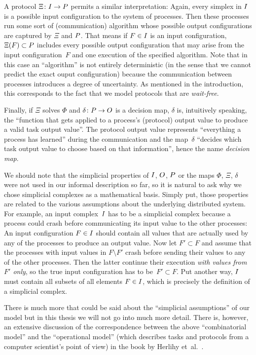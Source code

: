 A protocol $\Xi\colon I\to P$ permits a similar interpretation:
Again, every simplex in $I$ is a possible input configuration to
the system of processes. Then these processes run some sort of
(communication) algorithm whose possible output configurations are
captured by $\Xi$ and $P$. That means if $F\in I$ is an input
configuration, $\Xi(F) \subset P$ includes every possible output
configuration that may arise from the input configuration~$F$ and
one execution of the specified algorithm. Note that in this case
an \enquote{algorithm} is not entirely deterministic (in the sense
that we cannot predict the exact ouput configuration) because the
communication between processes introduces a degree of uncertainty.
As mentioned in the introduction, this corresponds to the fact that
we model protocols that are \emph{wait-free}.

Finally, if $\Xi$ solves $\Phi$ and $\delta\colon P\to O$ is a decision
map, $\delta$ is, intuitively speaking, the \enquote{function that
gets applied to a process's (protocol) output value to produce a valid
task output value}. The protocol output value represents
\enquote{everything a process has learned} during the communication
and the map~$\delta$ \enquote{decides which task output value to
choose based on that information}, hence the name \emph{decision map}.

We should note that the simplicial properties of $I$, $O$, $P$
or the maps $\Phi$, $\Xi$, $\delta$ were not used in our informal
description so far, so it is natural to ask why we chose simplicial
complexes as a mathematical basis. Simply put, those properties are
related to the various assumptions about the underlying distributed
system. For example, an input complex~$I$ has to be a simplicial 
complex because a process could crash before communicating its input
value to the other processes: An input configuration $F\in I$
should contain all values that are actually used by any of
the processes to produce an output value. Now let $F'\subset F$ and
assume that the processes with input values in $F\setminus F'$ crash
before sending their values to any of the other processes. Then the
latter continue their execution \emph{with values from~$F'$ only}, so
the true input configuration has to be~$F'\subset F$. Put another way,
$I$ must contain all subsets of all elements $F\in I$, which is
precisely the definition of a simplicial complex.

There is much more that could be said about the \enquote{simplicial
assumptions} of our model but in this thesis we will not go into much more
detail. There is, however, an extensive discussion of the
correspondence between the above \enquote{combinatorial model} and the
\enquote{operational model} (which describes tasks and protocols from
a computer scientist's point of view) in the book by
Herlihy et~al.~\cite[Ch.\,4]{bookc:herlihyetal13}.

